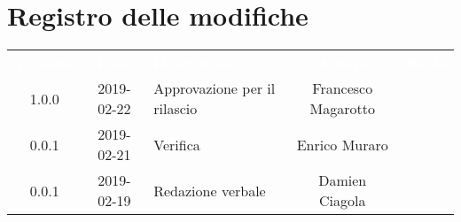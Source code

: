 \section*{Registro delle modifiche}
{
	\renewcommand{\arraystretch}{1.5}
	\centering
	\begin{longtable}{ c c  C{4cm}  c  c }
		
		\textcolor{white}{\textbf{Versione}} & \textcolor{white}{\textbf{Data}} & \textcolor{white}{\textbf{Descrizione}} & \textcolor{white}{\textbf{Autore}} & \textcolor{white}{\textbf{Ruolo}}\\
		1.0.0 & 2019-02-22 & Approvazione per il rilascio & Francesco Magarotto & \Res{} \\
		0.0.1 & 2019-02-21 & Verifica & Enrico Muraro & \ver{}\\
		0.0.1 & 2019-02-19 & Redazione verbale & Damien Ciagola & \reda{}\\
		
		
	\end{longtable}
	
}